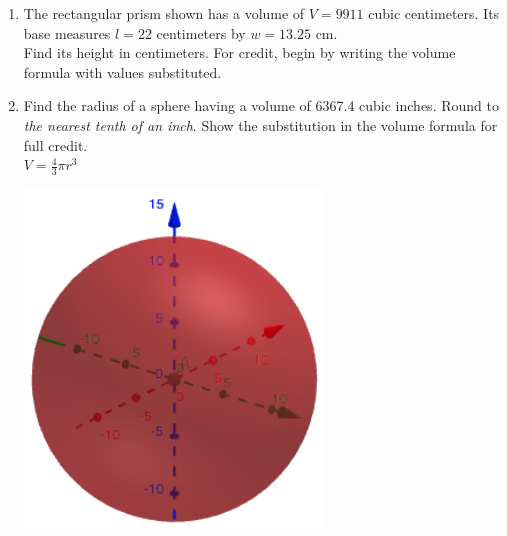 \begin{enumerate}
\item The rectangular prism shown has a volume of $V=9911$ cubic centimeters. Its base measures $l=22$ centimeters by $w=13.25$ cm. \\[0.5cm]
Find its height in centimeters. For credit, begin by writing the volume formula with values substituted.
\begin{flushright}
\end{flushright}

\item Find the radius of a sphere having a volume of 6367.4 cubic inches. Round to \emph{the nearest tenth of an inch}. Show the substitution in the volume formula for full credit. \\[0.5cm]
$\displaystyle V = \frac{4}{3} \pi r^3$
  \begin{flushright}
    \includegraphics[width=8cm]{../graphics/04sphere.png}
  \end{flushright}


\end{enumerate}
